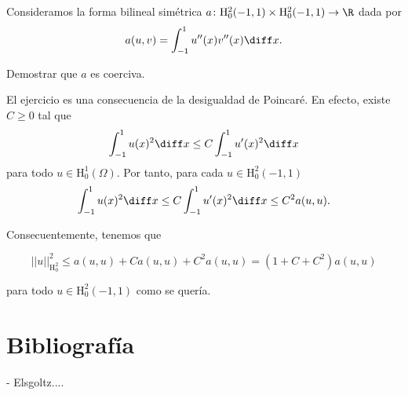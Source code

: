 \documentclass{article}
\begin{document}
\begin{ex}
  Consideramos la forma bilineal simétrica
  $a \colon \mathrm{H}_0^2(-1,1) \times \mathrm{H}_0^2(-1,1) \to \R$ dada por
  \[ a(u,v) = \int_{-1}^{1} u''(x) v''(x) \diff x. \]

  Demostrar que $a$ es coerciva.

  El ejercicio es una consecuencia de la desigualdad de Poincaré. En efecto, existe $C \ge 0$ tal
  que
  \[ \int_{-1}^1 u(x)^2 \diff x \le C \int_{-1}^1 u'(x)^2 \diff x\] para todo
  $u \in \mathrm{H}_0^1(\Omega)$.  Por tanto, para cada $u \in \mathrm{H}_0^2(-1,1)$
  \[ \int_{-1}^1 u(x)^2 \diff x \le C \int_{-1}^1 u'(x)^2 \diff x \le C^2 a(u,u).\]

  Consecuentemente, tenemos que

  \[ ||u||_{\mathrm{H}^2_0}^2 \le a(u,u) + C a(u,u) + C^2 a(u,u) = (1+C+C^2) a(u,u) \]

  para todo $u \in \mathrm{H}_0^2(-1,1)$ como se quería.
\end{ex}



\section{Bibliografía}

- Elsgoltz....
\end{document}
